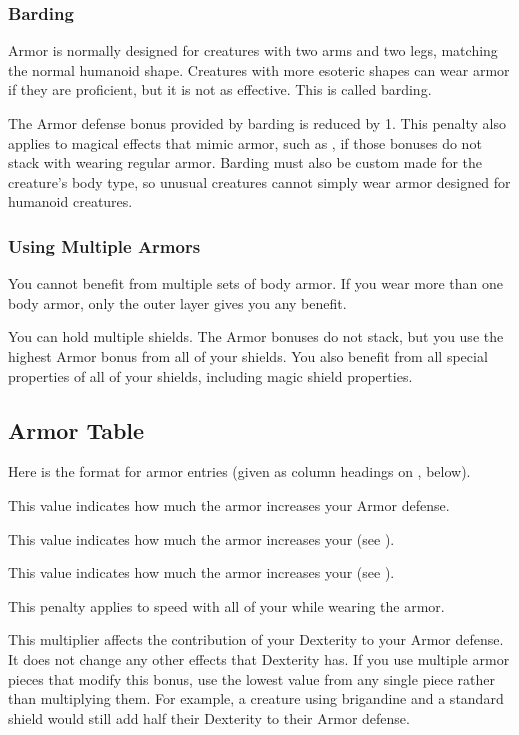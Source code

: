     \subsubsection{Barding}\label{Barding}
      Armor is normally designed for creatures with two arms and two legs, matching the normal humanoid shape.
      Creatures with more esoteric shapes can wear armor if they are proficient, but it is not as effective.
      This is called barding.

      The Armor defense bonus provided by barding is reduced by 1.
      This penalty also applies to magical effects that mimic armor, such as , if those bonuses do not stack with wearing regular armor.
      Barding must also be custom made for the creature's body type, so unusual creatures cannot simply wear armor designed for humanoid creatures.

    \subsubsection{Using Multiple Armors}
      You cannot benefit from multiple sets of body armor.
      If you wear more than one body armor, only the outer layer gives you any benefit.

      You can hold multiple shields.
      The Armor bonuses do not stack, but you use the highest Armor bonus from all of your shields.
      You also benefit from all special properties of all of your shields, including magic shield properties.

  \subsection{Armor Table}
    \par Here is the format for armor entries (given as column headings on , below).

     This value indicates how much the armor increases your Armor defense.

     This value indicates how much the armor increases your  (see ).

     This value indicates how much the armor increases your  (see ).

     This penalty applies to speed with all of your  while wearing the armor.

     This multiplier affects the contribution of your Dexterity to your Armor defense.
    It does not change any other effects that Dexterity has.
    If you use multiple armor pieces that modify this bonus, use the lowest value from any single piece rather than multiplying them.
    For example, a creature using brigandine and a standard shield would still add half their Dexterity to their Armor defense.

